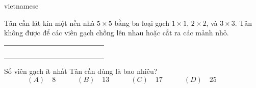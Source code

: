 \documentclass{article}
\begin{document}
\begin{otherlanguage*}{vietnamese}
\bigbreak

\begin{problem*}[PI-2024-C-P11]
    \label{problem:pi-2024-c-p11}

    Tân cần lát kín một nền nhà $5\times 5$ bằng ba loại gạch $1 \times 1$, $2 \times 2$, và $3 \times 3$.
    Tân không được để các viên gạch chồng lên nhau hoặc cắt ra các mảnh nhỏ.

    \begin{center}
        \begin{tabular}{|l|l|l|l|l|lllllllll}
        \cline{1-5} \cline{12-14}
         &  &  &  &  &                       &                       &                       &                       &                       & \multicolumn{1}{l|}{} & \multicolumn{1}{l|}{} & \multicolumn{1}{l|}{} & \multicolumn{1}{l|}{} \\ \cline{1-5} \cline{9-10} \cline{12-14} 
         &  &  &  &  &                       &                       & \multicolumn{1}{l|}{} & \multicolumn{1}{l|}{} & \multicolumn{1}{l|}{} & \multicolumn{1}{l|}{} & \multicolumn{1}{l|}{} & \multicolumn{1}{l|}{} & \multicolumn{1}{l|}{} \\ \cline{1-5} \cline{7-7} \cline{9-10} \cline{12-14} 
         &  &  &  &  & \multicolumn{1}{l|}{} & \multicolumn{1}{l|}{} & \multicolumn{1}{l|}{} & \multicolumn{1}{l|}{} & \multicolumn{1}{l|}{} & \multicolumn{1}{l|}{} & \multicolumn{1}{l|}{} & \multicolumn{1}{l|}{} & \multicolumn{1}{l|}{} \\ \cline{1-5} \cline{7-7} \cline{9-10} \cline{12-14} 
         &  &  &  &  &                       &                       &                       &                       &                       &                       &                       &                       &                       \\ \cline{1-5}
         &  &  &  &  &                       &                       &                       &                       &                       &                       &                       &                       &                       \\ \cline{1-5}
        \end{tabular}
    \end{center}

    Số viên gạch ít nhất Tân cần dùng là bao nhiêu?
    \[
        (A) \quad 8 \qquad \quad
        (B) \quad 13 \qquad \quad
        (C) \quad 17 \qquad \quad
        (D) \quad 25 \qquad \quad
    \]
\end{problem*}


\end{otherlanguage*}
\end{document}

